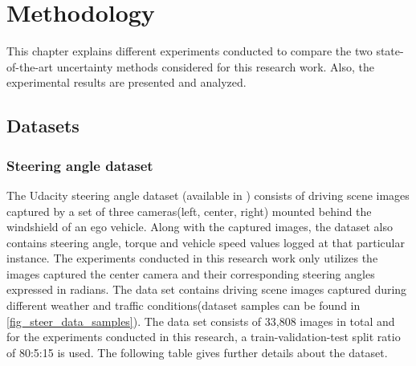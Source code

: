 

\chapter{Methodology}\label{chap_methodology}
This chapter explains different experiments conducted to compare the two state-of-the-art uncertainty methods considered for this research work. Also, the experimental results are presented and analyzed.
\section{Datasets}
\subsection{Steering angle dataset}
The Udacity steering angle dataset (available in \cite{udacity_dataset}) consists of driving scene images captured by a set of three cameras(left, center, right) mounted behind the windshield of an ego vehicle. Along with the captured images, the dataset also contains steering angle, torque and vehicle speed values logged at that particular instance. The experiments conducted in this research work only utilizes the images captured the center camera and their corresponding steering angles expressed in radians. The data set contains driving scene images captured during different weather and traffic conditions(dataset samples can be found in \ref{fig_steer_data_samples}). The data set consists of 33,808 images in total and for the experiments conducted in this research, a train-validation-test split ratio of 80:5:15 is used. The following table gives further details about the dataset.

